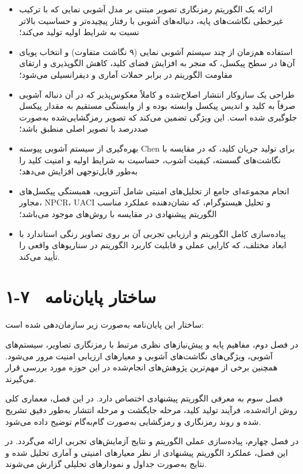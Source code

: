 \begin{itemize}
    \item ارائه یک الگوریتم رمزنگاری تصویر مبتنی بر مدل آشوبی نمایی که با ترکیب غیرخطی نگاشت‌های پایه، دنباله‌های آشوبی با رفتار پیچیده‌تر و حساسیت بالاتر نسبت به شرایط اولیه تولید می‌کند؛
    \item استفاده هم‌زمان از چند سیستم آشوبی نمایی (۹ نگاشت متفاوت) و انتخاب پویاى آن‌ها در سطح پیکسل، که منجر به افزایش فضای کلید، کاهش الگوپذیری و ارتقای مقاومت الگوریتم در برابر حملات آماری و دیفرانسیلی می‌شود؛
    \item طراحی یک سازوکار انتشار اصلاح‌شده و کاملاً معکوس‌پذیر که در آن دنباله آشوبی صرفاً به کلید و اندیس پیکسل وابسته بوده و از وابستگی مستقیم به مقدار پیکسل جلوگیری شده است. این ویژگی تضمین می‌کند که تصویر رمزگشایی‌شده به‌صورت صددرصد با تصویر اصلی منطبق باشد؛
    \item بهره‌گیری از سیستم آشوبی پیوسته ‎Chen‎ برای تولید جریان کلید، که در مقایسه با نگاشت‌های گسسته، کیفیت آشوب، حساسیت به شرایط اولیه و امنیت کلید را به‌طور قابل‌توجهی افزایش می‌دهد؛
    \item انجام مجموعه‌ای جامع از تحلیل‌های امنیتی شامل آنتروپی، همبستگی پیکسل‌های مجاور، ‎NPCR‎، ‎UACI‎ و تحلیل هیستوگرام، که نشان‌دهنده عملکرد مناسب الگوریتم پیشنهادی در مقایسه با روش‌های موجود می‌باشد؛
    \item پیاده‌سازی کامل الگوریتم و ارزیابی تجربی آن بر روی تصاویر رنگی استاندارد با ابعاد مختلف، که کارایی عملی و قابلیت کاربرد الگوریتم در سناریوهای واقعی را تأیید می‌کند.
\end{itemize}

\section{۱-۷  ساختار پایان‌نامه}

ساختار این پایان‌نامه به‌صورت زیر سازمان‌دهی شده است:

در فصل دوم، مفاهیم پایه و پیش‌نیازهای نظری مرتبط با رمزنگاری تصاویر، سیستم‌های آشوبی، ویژگی‌های نگاشت‌های آشوبی و معیارهای ارزیابی امنیت مرور می‌شود. همچنین برخی از مهم‌ترین پژوهش‌های انجام‌شده در این حوزه مورد بررسی قرار می‌گیرند.

فصل سوم به معرفی الگوریتم پیشنهادی اختصاص دارد. در این فصل، معماری کلی روش ارائه‌شده، فرآیند تولید کلید، مرحله جایگشت و مرحله انتشار به‌طور دقیق تشریح شده و روند رمزنگاری و رمزگشایی به‌صورت گام‌به‌گام توضیح داده می‌شود.

در فصل چهارم، پیاده‌سازی عملی الگوریتم و نتایج آزمایش‌های تجربی ارائه می‌گردد. در این فصل، عملکرد الگوریتم پیشنهادی از نظر معیارهای امنیتی و آماری تحلیل شده و نتایج به‌صورت جداول و نمودارهای تحلیلی گزارش می‌شوند.

